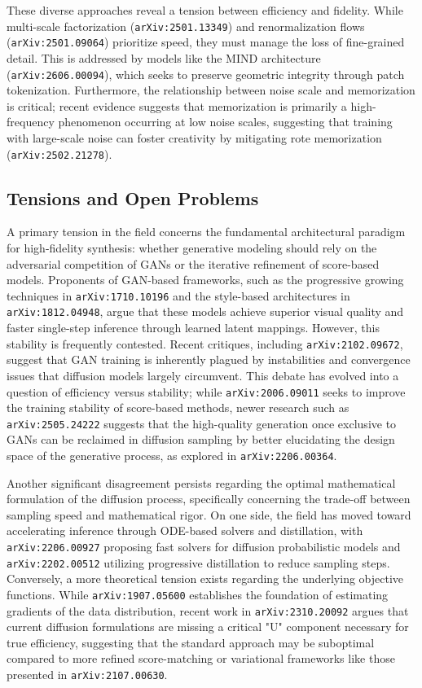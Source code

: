 \documentclass[11pt]{article}
\begin{document}
These diverse approaches reveal a tension between efficiency and fidelity. While multi-scale factorization (\texttt{arXiv:2501.13349}) and renormalization flows (\texttt{arXiv:2501.09064}) prioritize speed, they must manage the loss of fine-grained detail. This is addressed by models like the MIND architecture (\texttt{arXiv:2606.00094}), which seeks to preserve geometric integrity through patch tokenization. Furthermore, the relationship between noise scale and memorization is critical; recent evidence suggests that memorization is primarily a high-frequency phenomenon occurring at low noise scales, suggesting that training with large-scale noise can foster creativity by mitigating rote memorization (\texttt{arXiv:2502.21278}).

\subsection{Tensions and Open Problems}

A primary tension in the field concerns the fundamental architectural paradigm for high-fidelity synthesis: whether generative modeling should rely on the adversarial competition of GANs or the iterative refinement of score-based models. Proponents of GAN-based frameworks, such as the progressive growing techniques in \texttt{arXiv:1710.10196} and the style-based architectures in \texttt{arXiv:1812.04948}, argue that these models achieve superior visual quality and faster single-step inference through learned latent mappings. However, this stability is frequently contested. Recent critiques, including \texttt{arXiv:2102.09672}, suggest that GAN training is inherently plagued by instabilities and convergence issues that diffusion models largely circumvent. This debate has evolved into a question of efficiency versus stability; while \texttt{arXiv:2006.09011} seeks to improve the training stability of score-based methods, newer research such as \texttt{arXiv:2505.24222} suggests that the high-quality generation once exclusive to GANs can be reclaimed in diffusion sampling by better elucidating the design space of the generative process, as explored in \texttt{arXiv:2206.00364}.

Another significant disagreement persists regarding the optimal mathematical formulation of the diffusion process, specifically concerning the trade-off between sampling speed and mathematical rigor. On one side, the field has moved toward accelerating inference through ODE-based solvers and distillation, with \texttt{arXiv:2206.00927} proposing fast solvers for diffusion probabilistic models and \texttt{arXiv:2202.00512} utilizing progressive distillation to reduce sampling steps. Conversely, a more theoretical tension exists regarding the underlying objective functions. While \texttt{arXiv:1907.05600} establishes the foundation of estimating gradients of the data distribution, recent work in \texttt{arXiv:2310.20092} argues that current diffusion formulations are missing a critical "U" component necessary for true efficiency, suggesting that the standard approach may be suboptimal compared to more refined score-matching or variational frameworks like those presented in \texttt{arXiv:2107.00630}.
\end{document}
